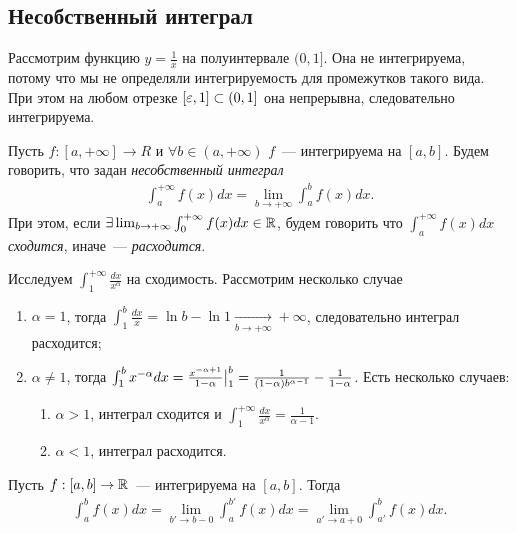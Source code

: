 \documentclass[../main.tex]{subfiles}
\begin{document}
\subsection{Несобственный интеграл}

Рассмотрим функцию $y= \frac{1}{x}$ на полуинтервале $(0,1]$. Она не интегрируема, потому что мы не определяли интегрируемость для промежутков такого вида. При этом на любом отрезке $[\varepsilon, 1] \subset (0, 1]$ она непрерывна, следовательно интегрируема.

\begin{definition}
    Пусть $f: [a, +\infty] \to R$ и $\forall b \in (a, +\infty)$ $f$~--- интегрируема на $[a,b]$. Будем говорить, что задан \emph{несобственный интеграл} 
    \begin{gather} 
      \int_{a}^{+\infty} f(x) dx = \lim_{b \to +\infty} \int_{a}^{b} f(x)dx .
    \end{gather}
    При этом, если $\exists \lim_{b \to + \infty} \int_{0}^{+\infty} f(x) dx \in \mathbb{R}$, будем говорить что $\int_{a}^{+\infty} f(x) dx$ \emph{сходится}, иначе~--- \emph{расходится}.
\end{definition}

\begin{example}
    Исследуем $\int_{1}^{+\infty} \frac{dx}{x^{\alpha}}$ на сходимость. Рассмотрим несколько случае
    \begin{enumerate}
        \item $\alpha=1$, тогда $\int_{1}^{b} \frac{dx}{x} = \ln b - \ln 1  \xrightarrow[b \to  + \infty ]{} + \infty $, следовательно интеграл расходится;
        \item $\alpha \neq 1$, тогда $\int_{1}^{b} x^{-\alpha} dx = \frac{x^{-\alpha+1}}{1-\alpha} \big|_{1}^{b} = \frac{1}{(1-\alpha)b^{\alpha-1}} - \frac{1}{1-\alpha}$. Есть несколько случаев:
        \begin{enumerate}
            \item $\alpha > 1$, интеграл сходится и $\int_{1}^{+\infty} \frac{dx}{x^{\alpha}} = \frac{1}{\alpha-1}$.
            \item $\alpha < 1$, интеграл расходится.  
        \end{enumerate}  
    \end{enumerate}  
\end{example}

\begin{proposition}
    Пусть $f:[a,b] \to \mathbb{R}$~--- интегрируема на $[a,b]$. Тогда 
    \begin{gather} 
        \int_{a}^{b} f(x) dx = \lim_{b' \to b-0} \int_{a}^{b'} f(x) dx  = \lim_{a' \to a+0} \int_{a'}^{b} f(x) dx.
    \end{gather}  
\end{proposition}
\end{document}
